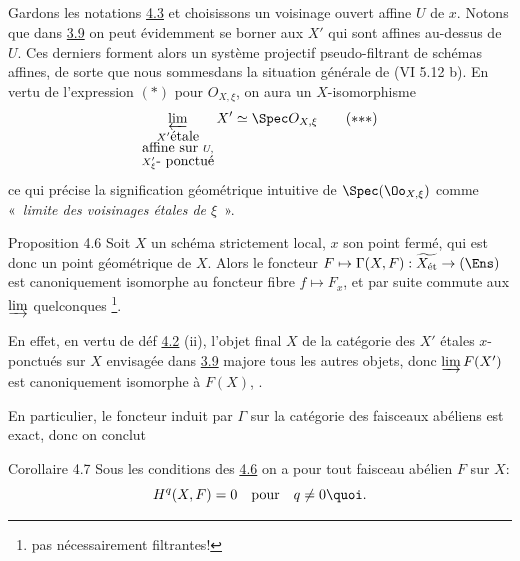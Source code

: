 \documentclass[10pt]{../fichiers-configuration-latex/smfart}
\begin{document}
\subsection{}

Gardons les notations  \hyperref[VIII.def4.3]{4.3} et choisissons un voisinage ouvert
affine $U$ de $x$. Notons que dans \hyperref[VIII.prop3.9]{3.9}
on peut évidemment se borner
aux $X'$ qui sont affines au-dessus de $U$. Ces derniers forment alors
un système projectif pseudo-filtrant de schémas affines, de sorte que
nous sommes\pageoriginale dans la situation générale de 
(\cf  VI 5.12 b). %
En vertu de l'expression $(\ast)$ pour $O_{X, \xi}$, on aura un
$X$-isomorphisme
\begin{equation*}
\varprojlim_{\substack{X' \mbox{\rm étale}\\ \mbox{affine sur } U,\\
X'_{\xi}\mbox{\rm - ponctué}}} X'\simeq \Spec O_{X, \xi}\tag{${\ast}{\ast}{\ast}$}
\end{equation*}
ce qui précise la signification géométrique intuitive de
$\Spec(\Oo_{X, \xi})$ comme « \emph{limite des voisinages étales
de $\xi$} ».

\begin{enonce*}{Proposition 4.6}
Soit $X$ un schéma strictement local, $x$ son point fermé, qui est
donc un point géométrique de $X$. Alors le foncteur $F \mapsto
\Gamma (X, F): \widetilde{X_{\text{\rm ét}}} \to (\Ens)$ est
canoniquement isomorphe au foncteur fibre $f \mapsto F_x$, et par
suite commute aux $\varinjlim$ quelconques \footnote{pas
nécessairement filtrantes!}.
\end{enonce*}

En effet, en vertu de déf \hyperref[VIII.def4.2]{4.2} (ii), l'objet final $X$ de la catégorie
des $X'$ étales $x$-ponctués sur $X$ envisagée dans \hyperref[VIII.prop3.9]{3.9}
majore tous
les autres objets, donc $\varinjlim F(X')$ est canoniquement isomorphe
à $F(X)$, \cqfd.

En particulier, le foncteur induit par $\Gamma$ sur la catégorie des
faisceaux abéliens est exact, donc on conclut

\begin{enonce*}{Corollaire 4.7}
Sous les conditions des \hyperref[VIII.prop4.6]{4.6}
on a pour tout faisceau abélien $F$ sur
$X$:
$$
H^q (X, F) = 0\quad \mbox{\rm pour}\quad q \neq 0{\quoi}.
$$
\end{enonce*}
\end{document}
